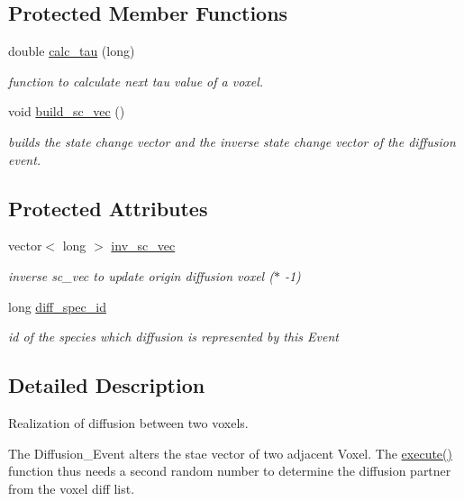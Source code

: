 \subsection*{Protected Member Functions}
\begin{DoxyCompactItemize}
\item 
double \hyperlink{classnw_1_1_diffusion___evt_a45b4ac64dd8f202de5b1e590b7a88621}{calc\+\_\+tau} (long)
\begin{DoxyCompactList}\small\item\em function to calculate next tau value of a voxel. \end{DoxyCompactList}\item 
void \hyperlink{classnw_1_1_diffusion___evt_a207aa73a53839282e1a399b5d4d7c3d1}{build\+\_\+sc\+\_\+vec} ()
\begin{DoxyCompactList}\small\item\em builds the state change vector and the inverse state change vector of the diffusion event. \end{DoxyCompactList}\end{DoxyCompactItemize}
\subsection*{Protected Attributes}
\begin{DoxyCompactItemize}
\item 
vector$<$ long $>$ \hyperlink{classnw_1_1_diffusion___evt_ab975d8f0ae97844b4d43222e94871707}{inv\+\_\+sc\+\_\+vec}
\begin{DoxyCompactList}\small\item\em inverse sc\+\_\+vec to update origin diffusion voxel ($\ast$ -\/1) \end{DoxyCompactList}\item 
long \hyperlink{classnw_1_1_diffusion___evt_a7193335899a1d41a902dff91fc0029dd}{diff\+\_\+spec\+\_\+id}
\begin{DoxyCompactList}\small\item\em id of the species which diffusion is represented by this Event \end{DoxyCompactList}\end{DoxyCompactItemize}


\subsection{Detailed Description}
Realization of diffusion between two voxels. 

The Diffusion\+\_\+\+Event alters the stae vector of two adjacent Voxel. The \hyperlink{classnw_1_1_diffusion___evt_a5cd6413241bd01ecb6a58fc0359ab57b}{execute()} function thus needs a second random number to determine the diffusion partner from the voxel diff list. 

